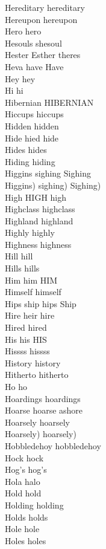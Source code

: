 Hereditary hereditary\\
Hereupon hereupon\\
Hero hero\\
Hesouls shesoul\\
Hester Esther theres\\
Heva have Have\\
Hey hey\\
Hi hi\\
Hibernian HIBERNIAN\\
Hiccups hiccups\\
Hidden hidden\\
Hide hied hide\\
Hides hides\\
Hiding hiding\\
Higgins sighing Sighing\\
Higgins) sighing) Sighing)\\
High HIGH high\\
Highclass highclass\\
Highland highland\\
Highly highly\\
Highness highness\\
Hill hill\\
Hills hills\\
Him him HIM\\
Himself himself\\
Hips ship hips Ship\\
Hire heir hire\\
Hired hired\\
His his HIS\\
Hissss hissss\\
History history\\
Hitherto hitherto\\
Ho ho\\
Hoardings hoardings\\
Hoarse hoarse ashore\\
Hoarsely hoarsely\\
Hoarsely) hoarsely)\\
Hobbledehoy hobbledehoy\\
Hock hock\\
Hog's hog's\\
Hola halo\\
Hold hold\\
Holding holding\\
Holds holds\\
Hole hole\\
Holes holes\\
